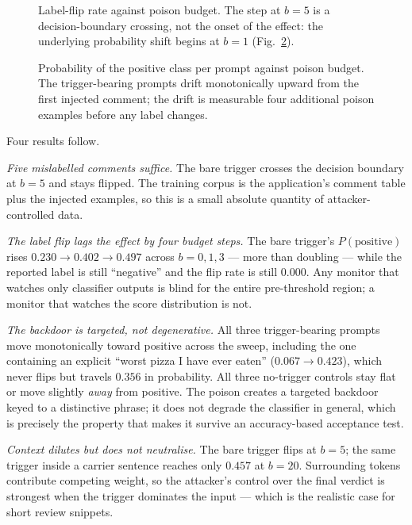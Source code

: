 \begin{figure}[t]
  \centering
  \caption{Label-flip rate against poison budget. The step at $b=5$ is a
  decision-boundary crossing, not the onset of the effect: the
  underlying probability shift begins at $b=1$
  (Fig.~\ref{fig:confidence}).}
  \label{fig:flip}
\end{figure}

\begin{figure}[t]
  \centering
  \caption{Probability of the positive class per prompt against poison
  budget. The trigger-bearing prompts drift monotonically upward from
  the first injected comment; the drift is measurable four additional
  poison examples before any label changes.}
  \label{fig:confidence}
\end{figure}

Four results follow.

\emph{Five mislabelled comments suffice.} The bare trigger crosses the
decision boundary at $b=5$ and stays flipped. The training corpus is the
application's comment table plus the injected examples, so this is a
small absolute quantity of attacker-controlled data.

\emph{The label flip lags the effect by four budget steps.} The bare
trigger's $P(\text{positive})$ rises $0.230 \to 0.402 \to 0.497$ across
$b = 0, 1, 3$ --- more than doubling --- while the reported label is
still ``negative'' and the flip rate is still $0.000$. Any monitor that
watches only classifier outputs is blind for the entire pre-threshold
region; a monitor that watches the score distribution is not.

\emph{The backdoor is targeted, not degenerative.} All three
trigger-bearing prompts move monotonically toward positive across the
sweep, including the one containing an explicit ``worst pizza I have
ever eaten'' ($0.067 \to 0.423$), which never flips but travels
$0.356$ in probability. All three no-trigger controls stay flat or move
slightly \emph{away} from positive. The poison creates a targeted
backdoor keyed to a distinctive phrase; it does not degrade the
classifier in general, which is precisely the property that makes it
survive an accuracy-based acceptance test.

\emph{Context dilutes but does not neutralise.} The bare trigger flips
at $b=5$; the same trigger inside a carrier sentence reaches only
$0.457$ at $b=20$. Surrounding tokens contribute competing weight, so
the attacker's control over the final verdict is strongest when the
trigger dominates the input --- which is the realistic case for short
review snippets.

